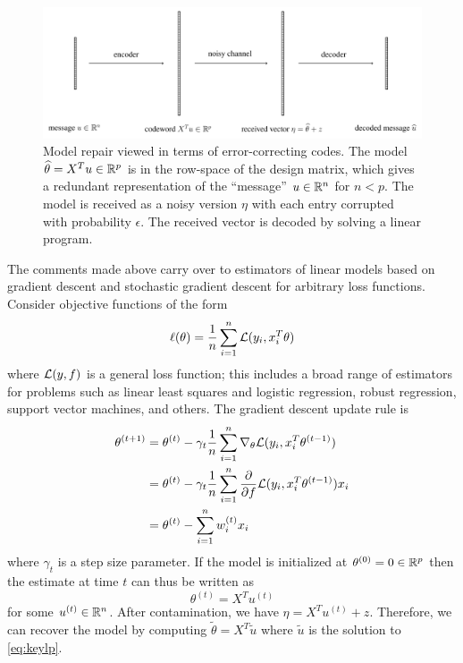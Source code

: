 \begin{figure}[t]
  \includegraphics[width=1.0\textwidth]{fig/code}
  \caption{Model repair viewed in terms of error-correcting codes. The model $\widehat\theta = X^T u\in\mathbb{R}^p$ is in the row-space of the design matrix, which gives a redundant representation of the ``message'' $u\in\mathbb{R}^n$ for $n < p$. The model is received as a noisy version $\eta$ with each entry corrupted with probability $\epsilon$. The received vector is decoded by solving a linear program.}
  \label{fig:code}
\end{figure}

The comments made above carry over to estimators of linear models based on gradient descent and stochastic gradient descent for arbitrary loss functions. Consider objective functions of the form
\begin{equation}
  \ell(\theta) = \frac{1}{n} \sum_{i=1}^n \L(y_i, x_i^T \theta)\label{eq:gen-obj}
\end{equation}
where ${\mathcal L}(y,f)$ is a general loss function; this includes
a broad range of estimators for problems such as linear least squares and logistic regression, robust regression, support vector machines, and others. The gradient descent update rule is
\begin{align}
  \theta^{(t+1)} &= \theta^{(t)} - \gamma_t \frac{1}{n} \sum_{i=1}^n \nabla_\theta \L(y_i, x_i^T \theta^{(t-1)}) \\
  &= \theta^{(t)} - \gamma_t \frac{1}{n} \sum_{i=1}^n \frac{\partial}{\partial f} \L(y_i, x_i^T \theta^{(t-1)}) x_i \\
  &= \theta^{(t)} - \sum_{i=1}^n w_i^{(t)} x_i
\end{align}
where $\gamma_t$ is a step size parameter. If the model is initialized at $\theta^{(0)}= 0\in\mathbb{R}^p$ then the estimate at time $t$ can thus be written as
\begin{equation}
  \theta^{(t)} = X^T u^{(t)}
\end{equation}
for some $u^{(t)}\in \mathbb{R}^n$. After contamination, we have $\eta = X^T u^{(t)} + z$. Therefore, we can recover the model
by computing  $\tilde\theta = X^T \tilde u$ where $\tilde u$ is the solution to \eqref{eq:keylp}.


